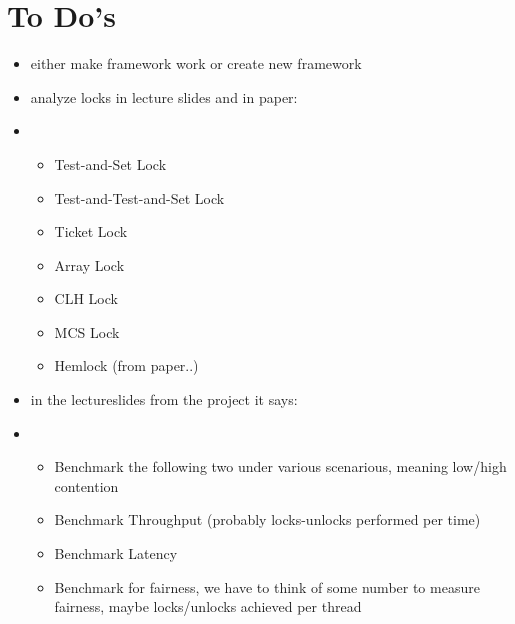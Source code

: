 \section*{To Do's}
\begin{itemize}
    \item either make framework work or create new framework
    \item analyze locks in lecture slides and in paper:
    \item \begin{itemize}
        \item Test-and-Set Lock
        \item Test-and-Test-and-Set Lock
        \item Ticket Lock
        \item Array Lock
        \item CLH Lock
        \item MCS Lock
        \item Hemlock (from paper..)
    \end{itemize}
    \item in the lectureslides from the project it says:
    \item \begin{itemize}
        \item Benchmark the following two under various scenarious, meaning low/high contention 
        \item Benchmark Throughput (probably locks-unlocks performed per time)
        \item Benchmark Latency 
        \item Benchmark for fairness, we have to think of some number to measure fairness, maybe locks/unlocks achieved per thread
    \end{itemize}
\end{itemize}
\pagebreak




